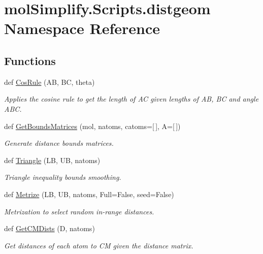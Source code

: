 \hypertarget{namespacemolSimplify_1_1Scripts_1_1distgeom}{}\section{mol\+Simplify.\+Scripts.\+distgeom Namespace Reference}
\label{namespacemolSimplify_1_1Scripts_1_1distgeom}
\subsection*{Functions}
\begin{DoxyCompactItemize}
\item 
def \hyperlink{namespacemolSimplify_1_1Scripts_1_1distgeom_a755cf7c0dbe32d75e3aa2c43ce1b8093}{Cos\+Rule} (AB, BC, theta)
\begin{DoxyCompactList}\small\item\em Applies the cosine rule to get the length of AC given lengths of AB, BC and angle A\+BC. \end{DoxyCompactList}\item 
def \hyperlink{namespacemolSimplify_1_1Scripts_1_1distgeom_a511e618a1e62d7d1ad97e26692c62a42}{Get\+Bounds\+Matrices} (mol, natoms, catoms=\mbox{[}$\,$\mbox{]}, A=\mbox{[}$\,$\mbox{]})
\begin{DoxyCompactList}\small\item\em Generate distance bounds matrices. \end{DoxyCompactList}\item 
def \hyperlink{namespacemolSimplify_1_1Scripts_1_1distgeom_a98a435bf4a8610164d5ba4dccf61f473}{Triangle} (LB, UB, natoms)
\begin{DoxyCompactList}\small\item\em Triangle inequality bounds smoothing. \end{DoxyCompactList}\item 
def \hyperlink{namespacemolSimplify_1_1Scripts_1_1distgeom_af91116418ad953ce66280bd1f3b014dd}{Metrize} (LB, UB, natoms, Full=False, seed=False)
\begin{DoxyCompactList}\small\item\em Metrization to select random in-\/range distances. \end{DoxyCompactList}\item 
def \hyperlink{namespacemolSimplify_1_1Scripts_1_1distgeom_a2bc5f7df82d7e489c9d6c56e743dd4de}{Get\+C\+M\+Dists} (D, natoms)
\begin{DoxyCompactList}\small\item\em Get distances of each atom to CM given the distance matrix. \end{DoxyCompactList}\item 

\end{DoxyCompactItemize}
